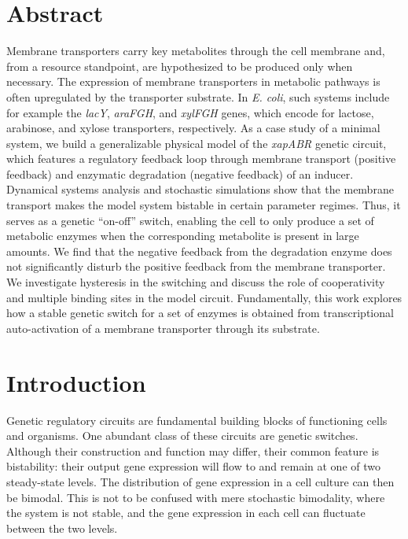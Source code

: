 \documentclass[10pt,letterpaper]{article}
\begin{document}
	\section*{Abstract}
	Membrane transporters carry key metabolites through the cell membrane
	and, from a resource standpoint, are hypothesized to be produced only when necessary. The
	expression of membrane transporters in metabolic pathways is often
	upregulated by the transporter substrate. In \emph{E. coli}, such systems
	include for example the \emph{lacY}, \emph{araFGH}, and \emph{xylFGH} genes,
	which encode for lactose, arabinose, and xylose transporters, respectively.
	As a case study of a minimal system, we build a
	generalizable physical model of the \emph{xapABR} genetic
	circuit, which features a regulatory feedback loop through membrane
	transport (positive feedback) and enzymatic degradation (negative feedback)
	of an inducer. Dynamical systems analysis and stochastic simulations show
	that the membrane transport makes the model system bistable in certain
	parameter regimes. Thus, it serves as a genetic ``on-off'' switch, enabling
	the cell to only produce a set of metabolic enzymes when the corresponding
	metabolite is present in large amounts. We find that the negative feedback
	from the degradation enzyme does not significantly disturb the positive
	feedback from the membrane transporter. We investigate hysteresis in the
	switching and discuss the role of cooperativity and multiple binding sites
	in the model circuit. Fundamentally, this work explores how a stable genetic
	switch for a set of enzymes is obtained from transcriptional auto-activation
	of a membrane transporter through its substrate.
	
	\linenumbers
	
	
	\section*{Introduction} 
	Genetic regulatory circuits are fundamental building blocks of functioning
	cells and organisms. One abundant class of these circuits are genetic
	switches. Although their construction and function may differ,
	their common feature is bistability: their output gene expression
	will flow to and remain at one of two steady-state levels.
	The distribution of
	gene expression in a cell culture can then be bimodal. This is not to be
	confused with mere stochastic bimodality, where the system is not stable,
	and the gene expression in each cell can fluctuate between the two levels.
	
\end{document}
